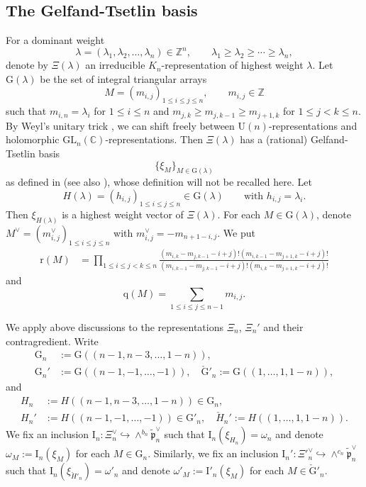\documentclass[12pt, a4paper]{amsart}
\newcommand{\RG}{{\mathrm {G}}}
\newcommand{\RI}{{\mathrm {I}}}
\newcommand{\RU}{{\mathrm {U}}}
\newcommand{\GL}{{\mathrm{GL}}}
\newcommand{\Z}{\mathbb{Z}}
\newcommand{\C}{\mathbb{C}}
\theoremstyle{Theorem}
\theoremstyle{Theorem}
\theoremstyle{Theorem}
\theoremstyle{Theorem}
\theoremstyle{Plain}
\theoremstyle{Definition}
\begin{document}
	
	
	
	\subsection{The Gelfand-Tsetlin basis}
	
	For a dominant weight 
	\[
	\lambda=(\lambda_1,\lambda_2,\dots,\lambda_n)\in\Z^n,\qquad\lambda_1\geq\lambda_2\geq\cdots\geq\lambda_n,
	\]
	denote by $\Xi(\lambda)$ an irreducible $K_n$-representation of highest weight $\lambda$. Let $\RG(\lambda)$ be the set of integral triangular arrays
	\[
	M=(m_{i,j})_{1\leq i\leq j\leq n},\qquad m_{i,j}\in\Z
	\]
	such that $m_{i,n}=\lambda_i$ for $1\leq i\leq n$ and $m_{j,k}\geq m_{j,k-1}\geq m_{j+1,k}$ for $1\leq j<k\leq n$. By Weyl's unitary trick \cite[Proposition 7.15]{Kn02}, we can shift freely between $\RU(n)$-representations and holomorphic $\GL_n(\C)$-representations. Then $\Xi(\lambda)$ has a (rational) Gelfand-Tsetlin basis
	\[
	\{\xi_M\}_{M\in\RG(\lambda)}
	\]
	as defined in \cite[Section 2.5]{IM} (see also \cite{GT50, Z85}), whose definition will not be recalled here. Let
	\[
	H(\lambda)=(h_{i,j})_{1\leq i\leq j\leq n}\in\RG(\lambda)\qquad\text{with }h_{i,j}=\lambda_i.
	\]
	Then $\xi_{H(\lambda)}$ is a highest weight vector of $\Xi(\lambda)$. For each $M\in\RG(\lambda)$, denote $M^{\vee}=(m^{\vee}_{i,j})_{1\leq i\leq j\leq n}$ with $m^{\vee}_{i,j}=-m_{n+1-i,j}$. We put
	\begin{equation}\label{r}
		\begin{aligned}
			\mathrm{r}(M)&=\prod_{1\leq i\leq j<k\leq n}\frac{(m_{i,k}-m_{j,k-1}-i+j)!(m_{i,k-1}-m_{j+1,k}-i+j)!}{(m_{i,k-1}-m_{j,k-1}-i+j)!(m_{i,k}-m_{j+1,k}-i+j)!}
		\end{aligned}
	\end{equation}
	and
	\begin{equation}\label{q}
		\mathrm{q}(M)=\sum_{1\leq i\leq j\leq n-1}m_{i,j}.
	\end{equation}
	
	
	We apply above discussions to the representations $\Xi_n$, $\Xi_n'$ and their contragredient. Write
	\[
	\begin{aligned}
		\RG_n&:=\RG\left((n-1,n-3,\dots,1-n)\right),\\
		\RG_n'&:=\RG\left((n-1,-1,\dots,-1)\right),\quad\check{\RG}'_n:=\RG\left((1,\dots,1,1-n)\right),
	\end{aligned}
	\]
	and
	\[
	\begin{aligned}
		H_n&:=H\left((n-1,n-3,\dots,1-n)\right)\in\RG_n,\\
		H_n'&:=H\left((n-1,-1,\dots,-1)\right)\in\RG'_n,\quad \check{H}_n':=H\left((1,\dots,1,1-n)\right).
	\end{aligned}
	\]
	We fix an inclusion $\RI_n:\Xi^{\vee}_n\hookrightarrow\wedge^{b_n}\widetilde{\mathfrak{p}}_n^{\vee}$ such that $\RI_n(\xi_{H_n})=\omega_n$ and denote $\omega_{M}:=\RI_n(\xi_{M})$ for each $M\in\RG_n$. Similarly, we fix an inclusion $\RI_n':\Xi'^{\vee}_n\hookrightarrow\wedge^{c_n}\widetilde{\mathfrak{p}}_n^{\vee}$ such that $\RI_n(\xi_{\check{H}'_n})=\omega'_n$ and denote $\omega'_{M}:=\RI'_n(\xi_{M})$ for each $M\in\check{\RG}'_n$.
	
\end{document}
